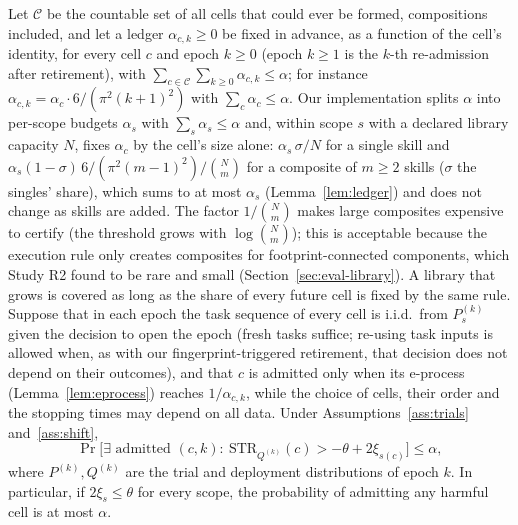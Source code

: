 \begin{theorem}\label{thm:admission}
Let $\mathcal{C}$ be the countable set of all cells that could ever be formed, compositions included, and let a ledger
$\alpha_{c,k}\ge0$ be fixed in advance, as a function of the cell's identity, for every cell $c$ and epoch $k\ge0$ (epoch
$k\ge1$ is the $k$-th re-admission after retirement), with $\sum_{c\in\mathcal{C}}\sum_{k\ge0}\alpha_{c,k}\le\alpha$; for
instance $\alpha_{c,k}=\alpha_c\cdot 6/(\pi^2(k+1)^2)$ with $\sum_c\alpha_c\le\alpha$.  Our implementation splits $\alpha$ into
per-scope budgets $\alpha_s$ with $\sum_s\alpha_s\le\alpha$ and, within scope $s$ with a declared library capacity $N$, fixes
$\alpha_c$ by the cell's size alone: $\alpha_s\,\sigma/N$ for a single skill and $\alpha_s(1-\sigma)\,6/(\pi^2(m-1)^2)/\binom{N}{m}$ for a
composite of $m\ge2$ skills ($\sigma$ the singles' share), which sums to at most $\alpha_s$ (Lemma~\ref{lem:ledger}) and does not
change as skills are added.
The factor $1/\binom{N}{m}$ makes large composites expensive to certify (the threshold grows with $\log\binom{N}{m}$); this is
acceptable because the execution rule only creates composites for footprint-connected components, which Study R2 found to be
rare and small (Section~\ref{sec:eval-library}).  A library that grows is covered as long
as the share of every future cell is fixed by the same rule.  Suppose that in each epoch the task sequence of every cell is
i.i.d.\ from $P^{(k)}_s$ given the decision to open the epoch (fresh tasks suffice; re-using task inputs is allowed when, as with our
fingerprint-triggered retirement, that decision does not depend on their outcomes), and that $c$ is admitted only when its e-process
(Lemma~\ref{lem:eprocess}) reaches $1/\alpha_{c,k}$, while the choice of cells, their order and the stopping times may depend
on all data.  Under Assumptions~\ref{ass:trials} and~\ref{ass:shift},
\[
  \Pr\bigl[\exists\text{ admitted }(c,k):\ \mathrm{STR}_{Q^{(k)}}(c)>-\theta+2\xi_{s(c)}\bigr]\le\alpha ,
\]
where $P^{(k)},Q^{(k)}$ are the trial and deployment distributions of epoch $k$.  In particular, if $2\xi_s\le\theta$ for
every scope, the probability of admitting any harmful cell is at most $\alpha$.
\end{theorem}

